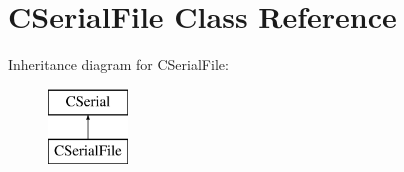 \hypertarget{classCSerialFile}{\section{C\-Serial\-File Class Reference}
\label{classCSerialFile}
}
Inheritance diagram for C\-Serial\-File\-:\begin{figure}[H]
\begin{center}
\leavevmode
\includegraphics[height=2.000000cm]{classCSerialFile}
\end{center}
\end{figure}
